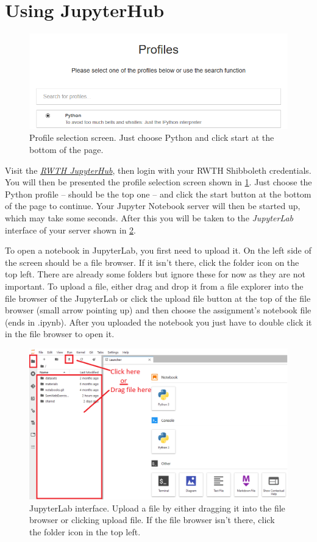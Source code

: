 \documentclass{article}
\begin{document}
	\section{Using JupyterHub}
	\begin{figure}[t]
		\centering
		\includegraphics[width=.8\textwidth]{img/profiles.png}
		\caption{Profile selection screen. Just choose Python and click start at the bottom of the page.}
		\label{fig:profiles}
	\end{figure}
	Visit the \href{https://jupyter.rwth-aachen.de/hub/login}{\emph{RWTH JupyterHub}}, then login with your RWTH Shibboleth credentials. You will then be presented the profile selection screen shown in \ref{fig:profiles}. Just choose the Python profile -- should be the top one -- and click the start button at the bottom of the page to continue. Your Jupyter Notebook server will then be started up, which may take some seconds. After this you will be taken to the \emph{JupyterLab} interface of your server shown in \ref{fig:jupyterlab}.

	
	To open a notebook in JupyterLab, you first need to upload it. On the left side of the screen should be a file browser. If it isn't there, click the folder icon on the top left. There are already some folders but ignore these for now as they are not important. To upload a file, either drag and drop it from a file explorer into the file browser of the JupyterLab or click the upload file button at the top of the file browser (small arrow pointing up) and then choose the assignment's notebook file (ends in .ipynb). After you uploaded the notebook you just have to double click it in the file browser to open it.

	\begin{figure}[b]
	\centering
	\includegraphics[width=\textwidth]{img/jupyterlab.png}
	\caption{JupyterLab interface. Upload a file by either dragging it into the file browser or clicking upload file. If the file browser isn't there, click the folder icon in the top left.}
	\label{fig:jupyterlab}
	\end{figure}
	
	
	
\end{document}
